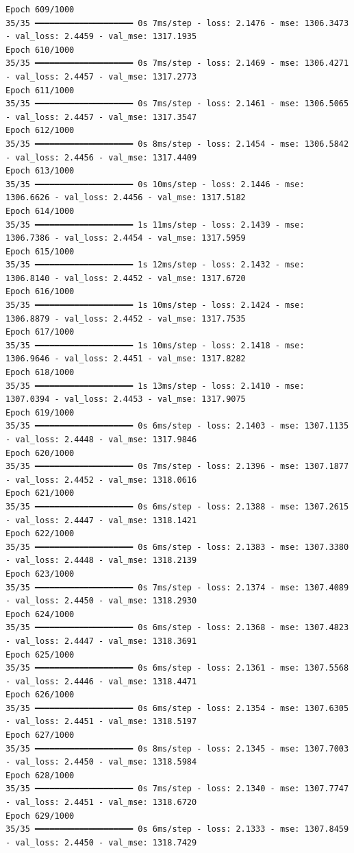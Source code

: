\documentclass[
  letterpaper,
  DIV=11,
  numbers=noendperiod]{scrreprt}
\begin{document}
\begin{verbatim}
Epoch 609/1000
35/35 ━━━━━━━━━━━━━━━━━━━━ 0s 7ms/step - loss: 2.1476 - mse: 1306.3473 - val_loss: 2.4459 - val_mse: 1317.1935
Epoch 610/1000
35/35 ━━━━━━━━━━━━━━━━━━━━ 0s 7ms/step - loss: 2.1469 - mse: 1306.4271 - val_loss: 2.4457 - val_mse: 1317.2773
Epoch 611/1000
35/35 ━━━━━━━━━━━━━━━━━━━━ 0s 7ms/step - loss: 2.1461 - mse: 1306.5065 - val_loss: 2.4457 - val_mse: 1317.3547
Epoch 612/1000
35/35 ━━━━━━━━━━━━━━━━━━━━ 0s 8ms/step - loss: 2.1454 - mse: 1306.5842 - val_loss: 2.4456 - val_mse: 1317.4409
Epoch 613/1000
35/35 ━━━━━━━━━━━━━━━━━━━━ 0s 10ms/step - loss: 2.1446 - mse: 1306.6626 - val_loss: 2.4456 - val_mse: 1317.5182
Epoch 614/1000
35/35 ━━━━━━━━━━━━━━━━━━━━ 1s 11ms/step - loss: 2.1439 - mse: 1306.7386 - val_loss: 2.4454 - val_mse: 1317.5959
Epoch 615/1000
35/35 ━━━━━━━━━━━━━━━━━━━━ 1s 12ms/step - loss: 2.1432 - mse: 1306.8140 - val_loss: 2.4452 - val_mse: 1317.6720
Epoch 616/1000
35/35 ━━━━━━━━━━━━━━━━━━━━ 1s 10ms/step - loss: 2.1424 - mse: 1306.8879 - val_loss: 2.4452 - val_mse: 1317.7535
Epoch 617/1000
35/35 ━━━━━━━━━━━━━━━━━━━━ 1s 10ms/step - loss: 2.1418 - mse: 1306.9646 - val_loss: 2.4451 - val_mse: 1317.8282
Epoch 618/1000
35/35 ━━━━━━━━━━━━━━━━━━━━ 1s 13ms/step - loss: 2.1410 - mse: 1307.0394 - val_loss: 2.4453 - val_mse: 1317.9075
Epoch 619/1000
35/35 ━━━━━━━━━━━━━━━━━━━━ 0s 6ms/step - loss: 2.1403 - mse: 1307.1135 - val_loss: 2.4448 - val_mse: 1317.9846
Epoch 620/1000
35/35 ━━━━━━━━━━━━━━━━━━━━ 0s 7ms/step - loss: 2.1396 - mse: 1307.1877 - val_loss: 2.4452 - val_mse: 1318.0616
Epoch 621/1000
35/35 ━━━━━━━━━━━━━━━━━━━━ 0s 6ms/step - loss: 2.1388 - mse: 1307.2615 - val_loss: 2.4447 - val_mse: 1318.1421
Epoch 622/1000
35/35 ━━━━━━━━━━━━━━━━━━━━ 0s 6ms/step - loss: 2.1383 - mse: 1307.3380 - val_loss: 2.4448 - val_mse: 1318.2139
Epoch 623/1000
35/35 ━━━━━━━━━━━━━━━━━━━━ 0s 7ms/step - loss: 2.1374 - mse: 1307.4089 - val_loss: 2.4450 - val_mse: 1318.2930
Epoch 624/1000
35/35 ━━━━━━━━━━━━━━━━━━━━ 0s 6ms/step - loss: 2.1368 - mse: 1307.4823 - val_loss: 2.4447 - val_mse: 1318.3691
Epoch 625/1000
35/35 ━━━━━━━━━━━━━━━━━━━━ 0s 6ms/step - loss: 2.1361 - mse: 1307.5568 - val_loss: 2.4446 - val_mse: 1318.4471
Epoch 626/1000
35/35 ━━━━━━━━━━━━━━━━━━━━ 0s 6ms/step - loss: 2.1354 - mse: 1307.6305 - val_loss: 2.4451 - val_mse: 1318.5197
Epoch 627/1000
35/35 ━━━━━━━━━━━━━━━━━━━━ 0s 8ms/step - loss: 2.1345 - mse: 1307.7003 - val_loss: 2.4450 - val_mse: 1318.5984
Epoch 628/1000
35/35 ━━━━━━━━━━━━━━━━━━━━ 0s 7ms/step - loss: 2.1340 - mse: 1307.7747 - val_loss: 2.4451 - val_mse: 1318.6720
Epoch 629/1000
35/35 ━━━━━━━━━━━━━━━━━━━━ 0s 6ms/step - loss: 2.1333 - mse: 1307.8459 - val_loss: 2.4450 - val_mse: 1318.7429

\end{verbatim}
\end{document}
